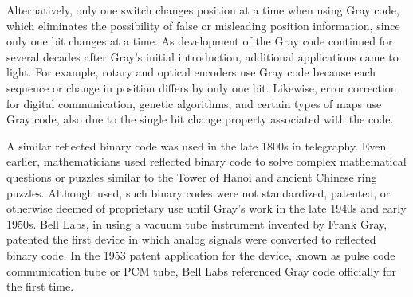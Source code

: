 Alternatively, only one switch changes position at a time when using Gray code, which eliminates the possibility of false or misleading position information, since only one bit changes at a time. As development of the Gray code continued for several decades after Gray's initial introduction, additional applications came to light. For example, rotary and optical encoders use Gray code because each sequence or change in position differs by only one bit. Likewise, error correction for digital communication, genetic algorithms, and certain types of maps use Gray code, also due to the single bit change property associated with the code.

A similar reflected binary code was used in the late 1800s in telegraphy. Even earlier, mathematicians used reflected binary code to solve complex mathematical questions or puzzles similar to the Tower of Hanoi and ancient Chinese ring puzzles. Although used, such binary codes were not standardized, patented, or otherwise deemed of proprietary use until Gray's work in the late 1940s and early 1950s. Bell Labs, in using a vacuum tube instrument invented by Frank Gray, patented the first device in which analog signals were converted to reflected binary code. In the 1953 patent application for the device, known as pulse code communication tube or PCM tube, Bell Labs referenced Gray code officially for the first time.
